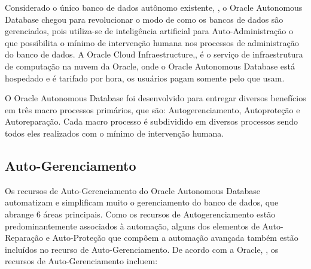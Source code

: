 Considerado o único banco de dados autônomo existente, \cite{Auricchio}, o Oracle Autonomous Database chegou para revolucionar o modo de como os bancos de dados são gerenciados, pois utiliza-se de inteligência artificial para Auto-Administração o que possibilita o mínimo de intervenção humana nos processos de administração do banco de dados. A Oracle Cloud Infraestructure,\cite{OCI}, é o serviço de infraestrutura de computação na nuvem da Oracle, onde o Oracle Autonomous Database está hospedado e é tarifado por hora, os usuários pagam somente pelo que usam.

O Oracle Autonomous Database foi desenvolvido para entregar diversos benefícios em três macro processos primários, que são: Autogerenciamento, Autoproteção e Autoreparação. Cada macro processo é subdividido em diversos processos sendo todos eles realizados com o mínimo de intervenção humana.


\subsection{Auto-Gerenciamento}

Os recursos de Auto-Gerenciamento do Oracle Autonomous Database automatizam e simplificam muito o gerenciamento do banco de dados, que abrange 6 áreas principais. Como os recursos de Autogerenciamento estão predominantemente associados à automação, alguns dos elementos de Auto-Reparação e Auto-Proteção que compõem a automação avançada também estão incluídos no recurso de Auto-Gerenciamento. De acordo com a Oracle, \cite{WPGestao}, os recursos de Auto-Gerenciamento incluem:

